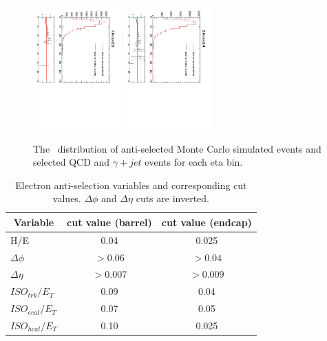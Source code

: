 \begin{figure}[htb]
\begin{center}
    \includegraphics*[width=0.3\textwidth, angle=90]{MetCompare_anti_eta5.pdf}
    \includegraphics*[width=0.3\textwidth, angle=90]{MetCompare_anti_eta6.pdf}
    \caption{\label{fig:MetComparison} The \ETm\ distribution of anti-selected Monte Carlo simulated events and selected QCD and $\gamma +jet$ events for each eta bin.}
  \end{center}
\end{figure}

\begin{table}[htbp]
  \begin{center}
    \leavevmode
    \begin{tabular}{lcc} 
      \multicolumn{1}{c}{Variable} & \multicolumn{1}{c}{cut value (barrel)}& \multicolumn{1}{c}{cut value (endcap)}\\\hline
        H/E & 0.04 & 0.025 \\
        $\Delta\phi$ & $>0.06$  & $>0.04$ \\
        $\Delta\eta$ & $>0.007$ & $>0.009$\\
        $ISO_{trk} / E_T $ & 0.09 & 0.04 \\
        $ISO_{ecal}/ E_T$  & 0.07 & 0.05 \\
        $ISO_{hcal}/ E_T$  & 0.10 & 0.025\\ 
    \end{tabular}
    \caption{\label{tab:AScuts}Electron anti-selection variables and corresponding cut values. $\Delta\phi$ and $\Delta\eta$ cuts are inverted.}
  \end{center}
\end{table}


